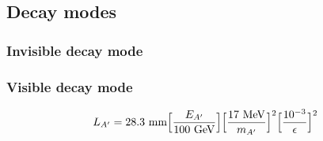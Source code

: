 \subsection{Decay modes}
\label{ch1:sec:dm-decay}

\subsubsection{Invisible decay mode}
\label{ch1:sec:dm-decay-invis}

\subsubsection{Visible decay mode}
\label{ch1:sec:dm-decay-vis}



  
\begin{eqnarray}
  L_{A'} = 28.3 ~{\rm mm}  \Bigl[\frac{E_{A'}}{100~ {\rm GeV}}\Bigr] 
  \Bigl[\frac{17~ {\rm MeV}}{m_{A'}}\Bigr]^2 \Bigl[\frac{10^{-3}}{\epsilon}\Bigr]^2
  \label{eq:dm-decay-length}
\end{eqnarray}

